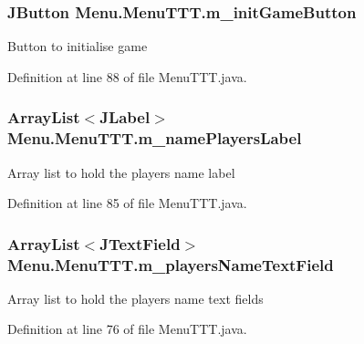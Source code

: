 \subsubsection[{m\+\_\+init\+Game\+Button}]{\setlength{\rightskip}{0pt plus 5cm}J\+Button Menu.\+Menu\+T\+T\+T.\+m\+\_\+init\+Game\+Button\hspace{0.3cm}{\ttfamily [private]}}\label{class_menu_1_1_menu_t_t_t_a59b7acc44f8e856bd54c46a8c81b1990}
Button to initialise game 

Definition at line 88 of file Menu\+T\+T\+T.\+java.

\hypertarget{class_menu_1_1_menu_t_t_t_a3a18e1c57089dedf1bdb8808affb405b}{}
\subsubsection[{m\+\_\+name\+Players\+Label}]{\setlength{\rightskip}{0pt plus 5cm}Array\+List$<$J\+Label$>$ Menu.\+Menu\+T\+T\+T.\+m\+\_\+name\+Players\+Label\hspace{0.3cm}{\ttfamily [private]}}\label{class_menu_1_1_menu_t_t_t_a3a18e1c57089dedf1bdb8808affb405b}
Array list to hold the players name label 

Definition at line 85 of file Menu\+T\+T\+T.\+java.

\hypertarget{class_menu_1_1_menu_t_t_t_a2398e606664e494a0bfd92cd4990404f}{}
\subsubsection[{m\+\_\+players\+Name\+Text\+Field}]{\setlength{\rightskip}{0pt plus 5cm}Array\+List$<$J\+Text\+Field$>$ Menu.\+Menu\+T\+T\+T.\+m\+\_\+players\+Name\+Text\+Field\hspace{0.3cm}{\ttfamily [private]}}\label{class_menu_1_1_menu_t_t_t_a2398e606664e494a0bfd92cd4990404f}
Array list to hold the player\textquotesingle{}s name text fields 

Definition at line 76 of file Menu\+T\+T\+T.\+java.

\hypertarget{class_menu_1_1_menu_t_t_t_a1f431306714855f214aacab632031a23}{}
